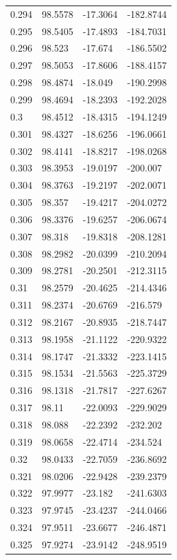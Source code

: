 \begin{tabular}{llll}
0.294 & 98.5578 & -17.3064 & -182.8744 \\
0.295 & 98.5405 & -17.4893 & -184.7031 \\
0.296 & 98.523 & -17.674 & -186.5502 \\
0.297 & 98.5053 & -17.8606 & -188.4157 \\
0.298 & 98.4874 & -18.049 & -190.2998 \\
0.299 & 98.4694 & -18.2393 & -192.2028 \\
0.3 & 98.4512 & -18.4315 & -194.1249 \\
0.301 & 98.4327 & -18.6256 & -196.0661 \\
0.302 & 98.4141 & -18.8217 & -198.0268 \\
0.303 & 98.3953 & -19.0197 & -200.007 \\
0.304 & 98.3763 & -19.2197 & -202.0071 \\
0.305 & 98.357 & -19.4217 & -204.0272 \\
0.306 & 98.3376 & -19.6257 & -206.0674 \\
0.307 & 98.318 & -19.8318 & -208.1281 \\
0.308 & 98.2982 & -20.0399 & -210.2094 \\
0.309 & 98.2781 & -20.2501 & -212.3115 \\
0.31 & 98.2579 & -20.4625 & -214.4346 \\
0.311 & 98.2374 & -20.6769 & -216.579 \\
0.312 & 98.2167 & -20.8935 & -218.7447 \\
0.313 & 98.1958 & -21.1122 & -220.9322 \\
0.314 & 98.1747 & -21.3332 & -223.1415 \\
0.315 & 98.1534 & -21.5563 & -225.3729 \\
0.316 & 98.1318 & -21.7817 & -227.6267 \\
0.317 & 98.11 & -22.0093 & -229.9029 \\
0.318 & 98.088 & -22.2392 & -232.202 \\
0.319 & 98.0658 & -22.4714 & -234.524 \\
0.32 & 98.0433 & -22.7059 & -236.8692 \\
0.321 & 98.0206 & -22.9428 & -239.2379 \\
0.322 & 97.9977 & -23.182 & -241.6303 \\
0.323 & 97.9745 & -23.4237 & -244.0466 \\
0.324 & 97.9511 & -23.6677 & -246.4871 \\
0.325 & 97.9274 & -23.9142 & -248.9519 \\

\end{tabular}
